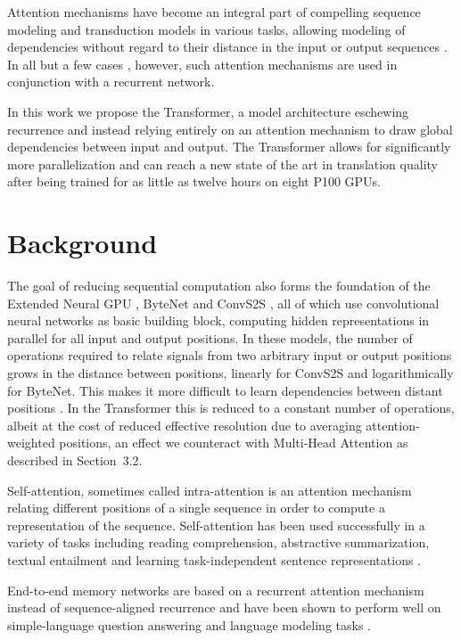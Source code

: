 Attention mechanisms have become an integral part of compelling sequence
modeling and transduction models in various tasks, allowing modeling of
dependencies without regard to their distance in the input or output sequences
\cite{bahdanau2014neural,structuredattentionnetworks}. In all but a few cases
\cite{decomposableattentionmodel}, however, such attention mechanisms are used
in conjunction with a recurrent network.

In this work we propose the Transformer, a model architecture eschewing
recurrence and instead relying entirely on an attention mechanism to draw
global dependencies between input and output. The Transformer allows for
significantly more parallelization and can reach a new state of the art in
translation quality after being trained for as little as twelve hours on eight
P100 GPUs.

\section{Background}

The goal of reducing sequential computation also forms the foundation of the
Extended Neural GPU \cite{extendedneuralgpu}, ByteNet
\cite{kalchbrenner2016neural} and ConvS2S \cite{gehring2017convolutional}, all
of which use convolutional neural networks as basic building block, computing
hidden representations in parallel for all input and output positions. In
these models, the number of operations required to relate signals from two
arbitrary input or output positions grows in the distance between positions,
linearly for ConvS2S and logarithmically for ByteNet. This makes it more
difficult to learn dependencies between distant positions
\cite{hochreiter2001gradient}. In the Transformer this is reduced to a
constant number of operations, albeit at the cost of reduced effective
resolution due to averaging attention-weighted positions, an effect we
counteract with Multi-Head Attention as described in Section~3.2.

Self-attention, sometimes called intra-attention is an attention mechanism
relating different positions of a single sequence in order to compute a
representation of the sequence. Self-attention has been used successfully in a
variety of tasks including reading comprehension, abstractive summarization,
textual entailment and learning task-independent sentence representations
\cite{cheng2016long,decomposableattentionmodel,paulus2017deep,lin2017structured}.

End-to-end memory networks are based on a recurrent attention mechanism
instead of sequence-aligned recurrence and have been shown to perform well on
simple-language question answering and language modeling tasks
\cite{sukhbaatar2015}.


